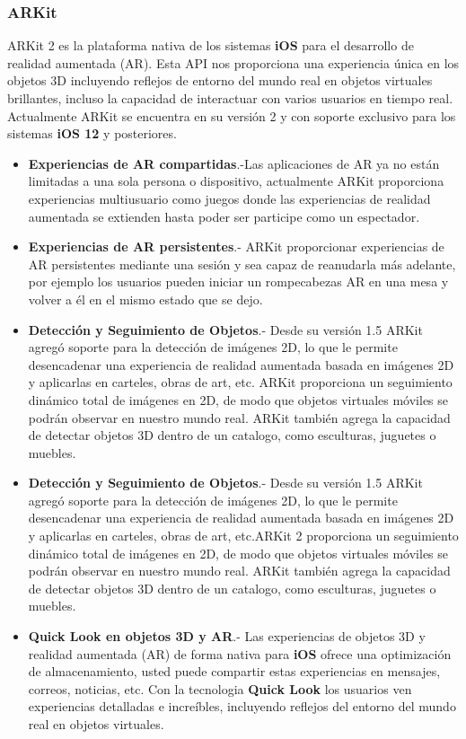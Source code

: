 \subsubsection{ARKit} ARKit 2 es la plataforma nativa de los sistemas \textbf{iOS} para el desarrollo de realidad aumentada (AR). Esta API nos proporciona una experiencia única en los objetos 3D incluyendo reflejos de entorno del mundo real en objetos virtuales brillantes, incluso la capacidad de interactuar con varios usuarios en tiempo real. Actualmente ARKit se encuentra en su versión 2 y con soporte exclusivo para los sistemas \textbf{iOS 12} y posteriores.\cite{B20}
\begin{itemize}
	\item \textbf{Experiencias de AR compartidas}.-Las aplicaciones de AR ya no están limitadas a una sola persona o dispositivo, actualmente ARKit proporciona experiencias multiusuario como juegos donde las experiencias de realidad aumentada se extienden hasta poder ser participe como un espectador.\cite{B20}
	\item \textbf{Experiencias de AR persistentes}.-
	ARKit proporcionar experiencias de AR persistentes  mediante una sesión  y sea capaz de reanudarla más adelante, por ejemplo los usuarios pueden iniciar un rompecabezas AR en una mesa y volver a él en el mismo estado que se dejo.\cite{B20}
	\item \textbf{Detección y Seguimiento de Objetos}.- Desde su versión 1.5  ARKit agregó soporte para la detección de imágenes 2D, lo que le permite desencadenar una experiencia de realidad aumentada basada en imágenes 2D y aplicarlas en  carteles, obras de art, etc. ARKit proporciona un seguimiento dinámico total de imágenes en 2D, de modo que objetos virtuales móviles se podrán observar en nuestro mundo real. ARKit  también agrega la capacidad de detectar objetos 3D dentro de un catalogo, como esculturas, juguetes o muebles.\cite{B20}
	\item \textbf{Detección y Seguimiento de Objetos}.- Desde su versión 1.5  ARKit agregó soporte para la detección de imágenes 2D, lo que le permite desencadenar una experiencia de realidad aumentada basada en imágenes 2D y aplicarlas en  carteles, obras de art, etc.ARKit 2 proporciona un seguimiento dinámico total de imágenes en 2D, de modo que objetos virtuales móviles se podrán observar en nuestro mundo real. ARKit también agrega la capacidad de detectar objetos 3D dentro de un catalogo, como esculturas, juguetes o muebles.\cite{B20}
	\item \textbf{Quick Look en objetos 3D y AR}.- Las experiencias de objetos 3D y realidad aumentada (AR) de forma nativa para \textbf{iOS} ofrece una optimización de almacenamiento, usted puede compartir estas experiencias en mensajes, correos, noticias, etc. Con la tecnologia \textbf{Quick Look} los usuarios ven experiencias detalladas e increíbles, incluyendo reflejos del entorno del mundo real en objetos virtuales.\cite{B20}
\end{itemize}
